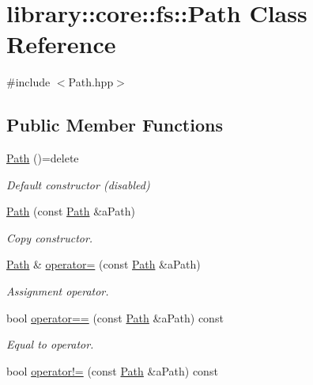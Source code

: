 \hypertarget{classlibrary_1_1core_1_1fs_1_1Path}{}\section{library\+:\+:core\+:\+:fs\+:\+:Path Class Reference}
\label{classlibrary_1_1core_1_1fs_1_1Path}


{\ttfamily \#include $<$Path.\+hpp$>$}

\subsection*{Public Member Functions}
\begin{DoxyCompactItemize}
\item 
\hyperlink{classlibrary_1_1core_1_1fs_1_1Path_aaba9a8e0153813f08f78f1c3275734a4}{Path} ()=delete
\begin{DoxyCompactList}\small\item\em Default constructor (disabled) \end{DoxyCompactList}\item 
\hyperlink{classlibrary_1_1core_1_1fs_1_1Path_aabc4240fc08479d1bff6b9753f2b5cc2}{Path} (const \hyperlink{classlibrary_1_1core_1_1fs_1_1Path}{Path} \&a\+Path)
\begin{DoxyCompactList}\small\item\em Copy constructor. \end{DoxyCompactList}\item 
\hyperlink{classlibrary_1_1core_1_1fs_1_1Path}{Path} \& \hyperlink{classlibrary_1_1core_1_1fs_1_1Path_a138827134fbe96f732c5708a6a331f89}{operator=} (const \hyperlink{classlibrary_1_1core_1_1fs_1_1Path}{Path} \&a\+Path)
\begin{DoxyCompactList}\small\item\em Assignment operator. \end{DoxyCompactList}\item 
bool \hyperlink{classlibrary_1_1core_1_1fs_1_1Path_add705556eb4509ab2868e322490a1e35}{operator==} (const \hyperlink{classlibrary_1_1core_1_1fs_1_1Path}{Path} \&a\+Path) const
\begin{DoxyCompactList}\small\item\em Equal to operator. \end{DoxyCompactList}\item 
bool \hyperlink{classlibrary_1_1core_1_1fs_1_1Path_a79b3a6951753c591bab57ee41f7c4c6f}{operator!=} (const \hyperlink{classlibrary_1_1core_1_1fs_1_1Path}{Path} \&a\+Path) const

\end{DoxyCompactItemize}
